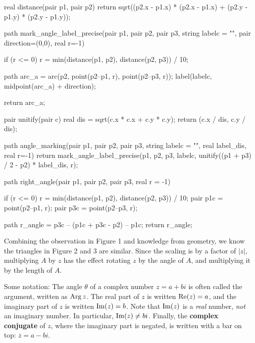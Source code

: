 \documentclass[../gatm.tex]{subfiles}
\begin{document}
\begin{asydef}


real distance(pair p1, pair p2) {
	return sqrt((p2.x - p1.x) * (p2.x - p1.x) + (p2.y - p1.y) * (p2.y - p1.y));
}

path mark_angle_label_precise(pair p1, pair p2, pair p3, string labelc = "", pair direction=(0,0), real r=-1) {
    if (r <= 0) {
    	r = min(distance(p1, p2), distance(p2, p3)) / 10;
	}
	
	path arc_a = arc(p2, point(p2--p1, r), point(p2--p3, r));
	label(labelc, midpoint(arc_a) + direction);
	
	return arc_a;
}

pair unitify(pair c) {
	real dis = sqrt(c.x * c.x + c.y * c.y);
	return (c.x / dis, c.y / dis);
}

path angle_marking(pair p1, pair p2, pair p3, string labelc = "", real label_dis, real r=-1) {
    return mark_angle_label_precise(p1, p2, p3, labelc, unitify((p1 + p3) / 2 - p2) * label_dis, r);
}

path right_angle(pair p1, pair p2, pair p3, real r = -1) {
	if (r <= 0) {
    	r = min(distance(p1, p2), distance(p2, p3)) / 10;
	}
	pair p1c = point(p2--p1, r);
	pair p3c = point(p2--p3, r);
	
	path r_angle = p3c -- (p1c + p3c - p2) -- p1c;
	return r_angle;
}

\end{asydef}

Combining the observation in Figure 1 and knowledge from geometry, we know the triangles in Figure 2 and 3 are similar. Since the scaling is by a factor of $|z|$, multiplying $A$ by $z$ has the effect rotating $z$ by the angle of $A$, and multiplying it by the length of $A$.

Some notation: The angle $\theta$ of a complex number $z = a+bi$ is often called the argument, written as $\operatorname{Arg} z$. The real part of $z$ is written $\operatorname{Re} (z) = a$, and the imaginary part of $z$ is written $\operatorname{Im} (z) = b$. Note that $\operatorname{Im} (z)$ is a \textit{real} number, \textit{not} an  imaginary number. In particular, $\operatorname{Im} (z) \neq bi$. Finally, the \textbf{complex conjugate} of $z$, where the imaginary part is negated, is written with a bar on top: $\overline{z} = a-bi$.
\end{document}
